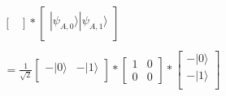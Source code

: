 \documentclass[a4paper,12pt]{article}
\begin{document}
\begin{enumerate}[label=(\alph*)]
\begin{gather*}
\begin{bmatrix}
\end{bmatrix} *
\begin{bmatrix}
|\psi_{A,0}\rangle |\psi_{A,1}\rangle \\
\end{bmatrix} \\~\\
= \frac{1}{\sqrt{2}}\begin{bmatrix}
-|0\rangle & -|1\rangle \\
\end{bmatrix} * 
\begin{bmatrix}
1 & 0 \\
 0 & 0
\end{bmatrix} *
\begin{bmatrix}
-|0\rangle\\
-|1\rangle \\
\end{bmatrix} \\~\\
\end{gather*}


\end{enumerate}
\end{document}
